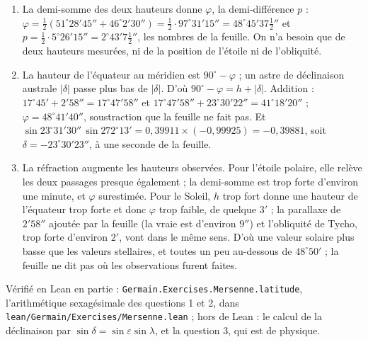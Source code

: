 \documentclass[11pt,a4paper]{article}
\begin{document}
\begin{solution}
\begin{enumerate}
\item La demi-somme des deux hauteurs donne $\varphi$, la demi-différence $p$ :
  $\varphi = \frac12(51^\circ 28' 45'' + 46^\circ 2' 30'') = \frac12\cdot 97^\circ 31' 15''
  = 48^\circ 45' 37\frac12''$ et $p = \frac12\cdot 5^\circ 26' 15'' = 2^\circ 43'
  7\frac12''$, les nombres de la feuille. On n'a besoin que de deux hauteurs
  mesurées, ni de la position de l'étoile ni de l'obliquité.
\item La hauteur de l'équateur au méridien est $90^\circ - \varphi$ ; un astre de
  déclinaison australe $|\delta|$ passe plus bas de $|\delta|$. D'où
  $90^\circ - \varphi = h + |\delta|$. Addition : $17^\circ 45' + 2' 58'' =
  17^\circ 47' 58''$ et $17^\circ 47' 58'' + 23^\circ 30' 22'' = 41^\circ 18' 20''$ ;
  $\varphi = 48^\circ 41' 40''$, soustraction que la feuille ne fait pas. Et
  $\sin 23^\circ 31' 30''\,\sin 272^\circ 13' = 0{,}39911\times(-0{,}99925) =
  -0{,}39881$, soit $\delta = -23^\circ 30' 23''$, à une seconde de la feuille.
\item La réfraction augmente les hauteurs observées. Pour l'étoile polaire, elle
  relève les deux passages presque également ; la demi-somme est trop forte d'environ
  une minute, et $\varphi$ surestimée. Pour le Soleil, $h$ trop fort donne une hauteur
  de l'équateur trop forte et donc $\varphi$ trop faible, de quelque $3'$ ; la parallaxe
  de $2' 58''$ ajoutée par la feuille (la vraie est d'environ $9''$) et l'obliquité de
  Tycho, trop forte d'environ $2'$, vont dans le même sens. D'où une valeur solaire
  plus basse que les valeurs stellaires, et toutes un peu au-dessous de $48^\circ 50'$ ;
  la feuille ne dit pas où les observations furent faites.
\end{enumerate}

Vérifié en Lean en partie : \texttt{Germain.Exercises.Mersenne.latitude}, l'arithmétique
sexagésimale des questions 1 et 2, dans \texttt{lean/Germain/Exercises/Mersenne.lean} ; hors de Lean : le calcul de la
déclinaison par $\sin\delta = \sin\varepsilon\sin\lambda$, et la question 3, qui est de
physique.
\end{solution}
\end{document}
